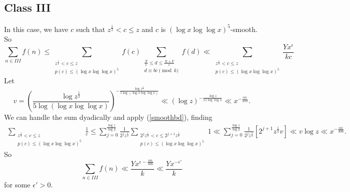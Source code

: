 \documentclass{amsart}
\begin{document}
\subsection{Class III}
In this case, we have $c$ such that $z^\frac 12<c\leq z$ and $c$ is $(\log x\log \log x)^5$-smooth.  So 
$$\sum_{n\in III}f(n)\leq \sum_{\substack{z^\frac 12<c\leq z \\ p(c)\leq (\log x\log \log x)^5}}f(c)\sum_{\substack{\frac Xc\leq d\leq \frac{X+Y}{c} \\ d\equiv b\overline{c}\pmod k }}f(d)\ll \sum_{\substack{z^\frac 12<c\leq z \\ p(c)\leq (\log x\log \log x)^5}}\frac{Yx^\epsilon}{kc}$$
Let $$v=\left(\frac{\log z^\frac 12}{5\log\left(\log x\log\log x\right)}\right)^{-\frac{\log z^\frac 12}{5\log\left(\log x\log\log x\right)}}\ll \left(\log z\right)^{-\frac{\log z}{11\log\log x}}\ll x^{-\frac{\alpha\kappa}{250}}.$$
We can handle the sum dyadically and apply (\ref{smoothbd}), finding
\begin{gather}\label{dyad}\sum_{\substack{z^\frac 12<c\leq z \\ p(c)\leq (\log x\log \log x)^5}}\frac{1}{c}\leq \sum_{j=0}^{\frac{\log z}{\log 2}}\frac{1}{2^jz^\frac 12}\sum_{\substack{2^jz^\frac 12<c\leq 2^{j+1}z^\frac 12 \\ p(c)\leq (\log x\log \log x)^5}}1 \ll \sum_{j=0}^{\frac{\log z}{\log 2}}\frac{1}{2^jz^\frac 12}\left[2^{j+1}z^\frac 12v\right]\ll v\log z\ll x^{-\frac{\alpha\kappa}{300}}.
\end{gather}
So
$$\sum_{n\in III}f(n)\ll \frac{Yx^{\epsilon-\frac{\alpha\kappa}{300}}}{k}\ll \frac{Yx^{-\epsilon'}}{k}$$
for some $\epsilon'>0$.
\end{document}

